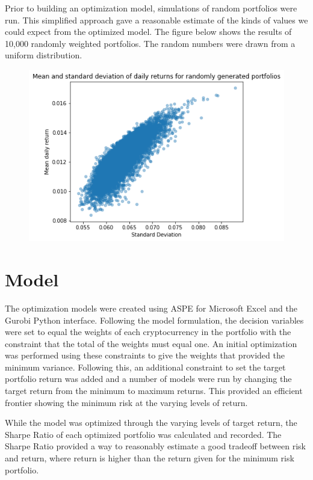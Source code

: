 \documentclass[11pt]{article} %
\begin{document}
Prior to building an optimization model, simulations of random portfolios were run. This simplified approach gave a reasonable estimate of the kinds of values we could expect from the optimized model. The figure below shows the results of 10,000 randomly weighted portfolios. The random numbers were drawn from a uniform distribution.


\begin{figure}[h]
\includegraphics{sim1}
\centering
\end{figure}
 
\section{Model}

The optimization models were created using ASPE for Microsoft Excel and the Gurobi Python interface. Following the model formulation, the decision variables were set to equal the weights of each cryptocurrency in the portfolio with the constraint that the total of the weights must equal one. An initial optimization was performed using these constraints to give the weights that provided the minimum variance. Following this, an additional constraint to set the target portfolio return was added and a number of models were run by changing the target return from the minimum to maximum returns. This provided an efficient frontier showing the minimum risk at the varying levels of return.

While the model was optimized through the varying levels of target return, the Sharpe Ratio of each optimized portfolio was calculated and recorded. The Sharpe Ratio provided a way to reasonably estimate a good tradeoff between risk and return, where return is higher than the return given for the minimum risk portfolio. 
\end{document}
